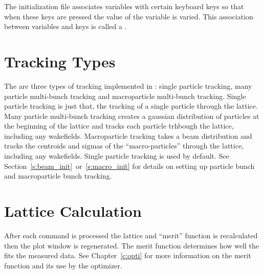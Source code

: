 The  initialization file associates variables with
certain keyboard keys so that when these keys are pressed the value of
the variable is varied. This association between variables and keys is
called a .

\section{Tracking Types}

The are three types of tracking implemented in \tao: single particle
tracking, many particle multi-bunch tracking and macroparticle
multi-bunch tracking.  Single particle tracking is just that, the
tracking of a single particle through the lattice. Many particle
multi-bunch tracking creates a gaussian distribution of particles at
the beginning of the lattice and tracks each particle trhbough the
lattice, including any wakefields. Macroparticle tracking takes a beam
distribution and tracks the centroids and sigmas of the
``macro-particles'' through the lattice, including any wakefields.
Single particle tracking is used by default. See
Section~\ref{s:beam_init}~or~\ref{s:macro_init} for details on setting
up particle bunch and macroparticle bunch tracking.

\section{Lattice Calculation}
\label{s:lat_calc}

After each \tao command is processed the lattice and ``merit''
function is recalculated then the plot window is regenerated. The
merit function determines how well the  fits the measured
data. See Chapter~\ref{c:opti} for more information on the merit
function and its use by the optimizer.


